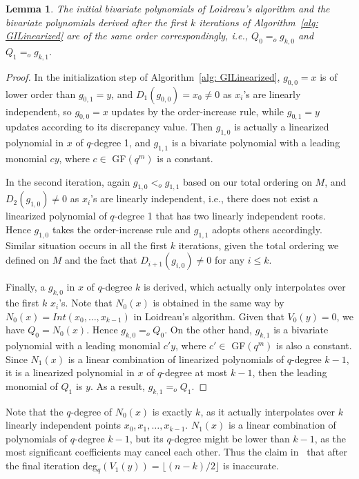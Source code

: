 \documentclass[11pt,onecolumn,draftcls]{IEEEtran}
\newtheorem{lemma}{Lemma}
\begin{document}
\begin{lemma} \label{Lemma: LdGIkit}
The initial bivariate polynomials of Loidreau's algorithm and the bivariate polynomials derived after the first $k$ iterations of Algorithm~\ref{alg: GILinearized} are of the same order correspondingly, i.e., $Q_0 =_o g_{k, 0}$ and $Q_1 =_o g_{k, 1}$.
\end{lemma}
\begin{proof}
 In the initialization step of Algorithm~\ref{alg: GILinearized}, $g_{0,0} =x$ is of lower order than $g_{0,1} =y$, and $D_1(g_{0,0}) = x_0 \ne 0$ as $x_i$'s are linearly independent, so $g_{0,0} = x$ updates by the order-increase rule, while $g_{0,1} =y$ updates according to its discrepancy value. Then $g_{1,0}$ is actually a linearized polynomial in $x$ of $q$-degree 1, and $g_{1,1}$ is a bivariate polynomial with a leading monomial $cy$, where $c \in$ GF$(q^m)$ is a constant.

 In the second iteration, again $g_{1,0} <_o g_{1,1}$ based on our total ordering on $M$, and $D_2(g_{1,0}) \ne 0$ as $x_i$'s are linearly independent, i.e., there does not exist a linearized polynomial of $q$-degree 1 that has two linearly independent roots. Hence $g_{1,0}$ takes the order-increase rule and $g_{1,1}$ adopts others accordingly. Similar situation occurs in all the first $k$ iterations, given the total ordering we defined on $M$ and the fact that $D_{i+1}(g_{i, 0}) \ne 0$ for any $i \le k$.

 Finally, a $g_{k,0}$ in $x$ of $q$-degree $k$ is derived, which actually only interpolates over the first $k$ $x_i$'s. Note that $N_0(x)$ is obtained in the same way by $N_0(x) = Int(x_0,\ldots, x_{k-1})$ in Loidreau's algorithm. Given that $V_0(y) = 0$,  we have $Q_0= N_0(x)$. Hence $g_{k,0} =_o Q_0$. On the other hand, $g_{k,1}$ is a bivariate polynomial with a leading monomial $c'y$, where $c' \in$ GF$(q^m)$ is also a constant. Since $N_1(x)$ is a linear combination of linearized polynomials of $q$-degree $k-1$, it is a linearized polynomial in $x$ of $q$-degree at most $k-1$, then the leading monomial of $Q_1$ is $y$. As a result, $g_{k,1} =_o Q_1$.
\end{proof}
Note that the $q$-degree of $N_0(x)$ is exactly $k$, as it actually interpolates over $k$ linearly independent points $x_0, x_1, \ldots, x_{k-1}$. $N_1(x)$ is a linear combination of polynomials of $q$-degree $k-1$, but its $q$-degree might be lower than $k-1$, as the most significant coefficients may cancel each other. Thus the claim in~\cite{loidreau_wcc05} that after the final iteration deg$_q(V_1(y)) = \lfloor (n-k) / 2\rfloor$ is inaccurate.
\end{document}
